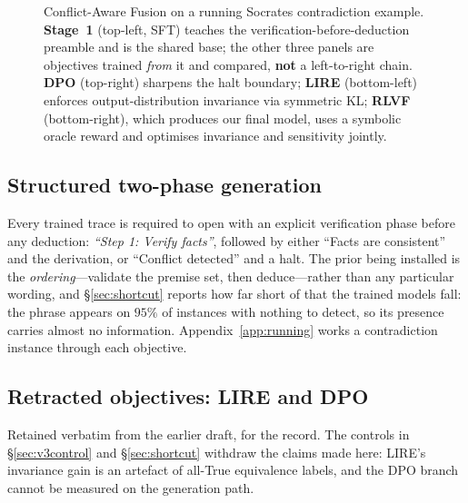 \documentclass{article}
\begin{document}
\begin{figure}[htbp]
{%
    }%
    \caption{Conflict-Aware Fusion on a running Socrates contradiction example. \textbf{Stage~1} (top-left, SFT) teaches the verification-before-deduction preamble and is the shared base; the other three panels are objectives trained \emph{from} it and compared, \textbf{not} a left-to-right chain. \textbf{DPO} (top-right) sharpens the halt boundary; \textbf{LIRE} (bottom-left) enforces output-distribution invariance via symmetric KL; \textbf{\textsc{RLVF}} (bottom-right), which produces our final model, uses a symbolic oracle reward and optimises invariance and sensitivity jointly.}
    \label{fig:fusion_structure}
\end{figure}



\subsection{Structured two-phase generation}
\label{sec:arch}
Every trained trace is required to open with an explicit verification phase
before any deduction: \emph{``Step 1: Verify facts''}, followed by either
``Facts are consistent'' and the derivation, or ``Conflict detected'' and a
halt. The prior being installed is the \emph{ordering}---validate the premise
set, then deduce---rather than any particular wording, and \S\ref{sec:shortcut}
reports how far short of that the trained models fall: the phrase appears on
$95\%$ of instances with nothing to detect, so its presence carries almost no
information. Appendix~\ref{app:running} works a contradiction instance through
each objective.

\subsection{Retracted objectives: LIRE and DPO}
\label{app:retracted}
Retained verbatim from the earlier draft, for the record. The controls in
\S\ref{sec:v3control} and \S\ref{sec:shortcut} withdraw the claims made here:
LIRE's invariance gain is an artefact of all-True equivalence labels, and the
DPO branch cannot be measured on the generation path.
\end{document}
